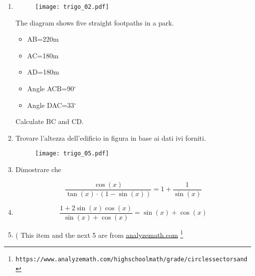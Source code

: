 \begin{enumerate} %

\item 

\begin{figure}[H]
\centering
\texttt{[image: trigo\_02.pdf]}
\end{figure}

The diagram shows five straight footpaths in a park.

\begin{itemize}
\item AB=220m
\item AC=180m
\item AD=180m
\item Angle ACB=90$^\circ$
\item Angle DAC=33$^\circ$
\end{itemize}

Calculate BC and CD.



\item 

Trovare l'altezza dell'edificio in figura in base ai dati ivi forniti.

\begin{figure}[H]
\centering
\texttt{[image: trigo\_05.pdf]}
\end{figure}


\item 

Dimostrare che 

\begin{equation*}
\frac{
\cos(x)
}{
\tan(x)\cdot\left(1-\sin(x)\right)
} = 1+\frac{1}{\sin(x)}
\end{equation*}

\item 

\begin{equation*}
\frac{
1+2\sin(x)\cos(x)
}{
\sin(x)+\cos(x)
}
=
\sin(x)+\cos(x)
\end{equation*}

\item
( This item and the next 5 are from 
\href{https://www.analyzemath.com/high\textunderscore school\textunderscore math/grade\textunderscore 12/circles\textunderscore sectors\textunderscore and\textunderscore trigonometry\textunderscore problems.html}{analyzemath.com}
\footnote{\texttt{https://www.analyzemath.com/high\textunderscore school\textunderscore math/grade/circles\textunderscore sectors\textunderscore and\textunderscore}

}
\end{enumerate}
